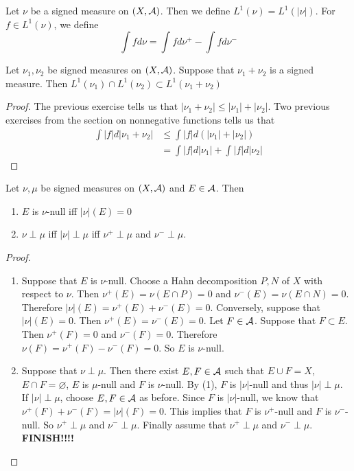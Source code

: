 \documentclass{book}
\begin{document}
	\begin{defn}  
		Let $\nu$ be a signed measure on $(X, \mathcal{A})$. Then we define $L^1(\nu) = L^1(|\nu|)$. For $f \in L^1(\nu)$, we define $$\int f d \nu = \int f d \nu^+ - \int f d\nu^-$$
	\end{defn}
	
	\begin{ex}  
		Let $\nu_1, \nu_2$ be signed measures on $(X, \mathcal{A})$. Suppose that $\nu_1 + \nu_2$ is a signed measure. Then 
		$L^1(\nu_1)\cap L^1(\nu_2) \subset L^1(\nu_1 + \nu_2)$
	\end{ex}
	
	\begin{proof}
		The previous exercise tells us that $|\nu_1 + \nu_2| \leq |\nu_1| + |\nu_2|$. Two previous exercises from the section on nonnegative functions tells us that 
		\begin{align*}
			\int |f|d |\nu_1 + \nu_2| 
			& \leq \int |f| d(|\nu_1|+|\nu_2|)\\
			&= \int |f|d |\nu_1| + \int |f| d|\nu_2|
		\end{align*}
	\end{proof}
	
	\begin{ex}  
		Let $\nu, \mu$ be signed measures on $(X,\mathcal{A})$ and $E \in \mathcal{A}$. Then 
		\begin{enumerate}
			\item $E$ is $\nu$-null iff $|\nu|(E) = 0$
			\item $\nu \perp \mu$ iff $|\nu| \perp \mu$ iff $\nu^+ \perp \mu$ and $\nu^- \perp \mu$.
		\end{enumerate}
	\end{ex}
	
	\begin{proof}
		\begin{enumerate}
			\item Suppose that $E$ is $\nu$-null. Choose a Hahn decomposition $P,N$ of $X$ with respect to $\nu$. Then $\nu^+(E) = \nu(E \cap P) = 0$ and $\nu^-(E) = \nu(E \cap N) = 0$. Therefore $|\nu|(E) = \nu^+(E) + \nu^-(E) = 0$. Conversely, suppose that $|\nu|(E) = 0$. Then $\nu^+(E) = \nu^-(E) = 0$. Let $F \in \mathcal{A}$. Suppose that $F \subset E$. Then $\nu^+(F) = 0$ and $\nu^-(F) = 0$. Therefore $\nu(F) = \nu^+(F) - \nu^-(F) = 0$. So $E$ is $\nu$-null.
			
			\item Suppose that $\nu \perp \mu$. Then there exist $E,F \in \mathcal{A}$ such that $E \cup F = X$, $E \cap F = \varnothing$, $E$ is $\mu$-null and $F$ is $\nu$-null. By (1), $F$ is $|\nu|$-null and thus $|\nu| \perp \mu$. If $|\nu| \perp \mu$, choose $E,F \in \mathcal{A}$ as before. Since $F$ is $|\nu|$-null, we know that $\nu^+(F) + \nu^-(F) = |\nu|(F) = 0$. This implies that $F$ is $\nu^+$-null and $F$ is $\nu^-$-null. So $\nu^+ \perp \mu$ and $\nu^- \perp \mu$. Finally assume that $\nu^+ \perp \mu$ and $\nu^- \perp \mu$. \textbf{FINISH!!!!}
			
		\end{enumerate}
	\end{proof}
	
\end{document}
